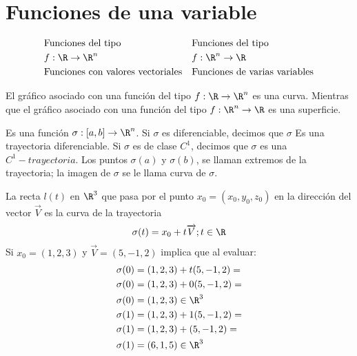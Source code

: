 \section{Funciones de una variable}
\begin{align*}
	 & \text{Funciones del tipo}                &  & \text{Funciones del tipo}            \\
	 & f:\R\to \R^n                             &  & f:\R^n\to \R                         \\
	 & \text{Funciones con valores vectoriales} &  & \text{Funciones de varias variables}
\end{align*}

El gráfico asociado con una función del tipo $f:\R\to \R^n$ es una curva.
Mientras que el gráfico asociado con una función del tipo $f:\R^n\to \R$ es una superficie.

\begin{definition}[Trayectoria en $\R^n$]
	Es una función $\sigma:\left[a,b\right]\to \R^n$. Si $\sigma$ es diferenciable, decimos que $\sigma$
	Es una trayectoria diferenciable. Si $\sigma$ es de clase $C^1$, decimos que $\sigma$ es una $C^1-trayectoria$.
	Los puntos $\sigma(a)$ y $\sigma(b)$, se llaman extremos de la trayectoria; la imagen de $\sigma$ se le llama curva de $\sigma$.
\end{definition}

\begin{example}
	La recta $l(t)$ en $\R^3$ que pasa por el punto $x_0=(x_0,y_0,z_0)$ en la dirección del vector $\overrightarrow{V}$ es la curva de la trayectoria
	\begin{equation*}
		\sigma(t)=x_0+t\overrightarrow{V}; t\in \R
	\end{equation*}
	Si $x_0=(1,2,3)$ y $\overrightarrow{V}=(5,-1,2)$ implica que al evaluar:
	\begin{align*}
		 & \sigma(0)=(1,2,3)+t(5,-1,2)= \\
		 & \sigma(0)=(1,2,3)+0(5,-1,2)= \\
		 & \sigma(0)=(1,2,3)\in \R^3    \\
		 & \sigma(1)=(1,2,3)+1(5,-1,2)= \\
		 & \sigma(1)=(1,2,3)+(5,-1,2)=  \\
		 & \sigma(1)=(6,1,5)\in \R^3
	\end{align*}
\end{example}


